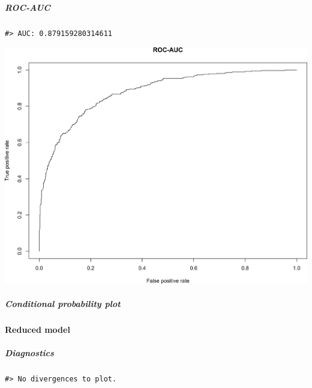 \documentclass[
]{article}
\begin{document}
\hypertarget{roc-auc}{%
\subparagraph{ROC-AUC}\label{roc-auc}}

\begin{verbatim}
#> AUC: 0.879159280314611
\end{verbatim}

\begin{center}\includegraphics[width=1\linewidth]{notebook_files/figure-latex/model1full_rocauc-1} \end{center}

\hypertarget{conditional-probability-plot}{%
\subparagraph{Conditional probability plot}\label{conditional-probability-plot}}

\hypertarget{reduced-model}{%
\paragraph{Reduced model}\label{reduced-model}}

\hypertarget{diagnostics-1}{%
\subparagraph{Diagnostics}\label{diagnostics-1}}

\begin{verbatim}
#> No divergences to plot.
\end{verbatim}
\end{document}
